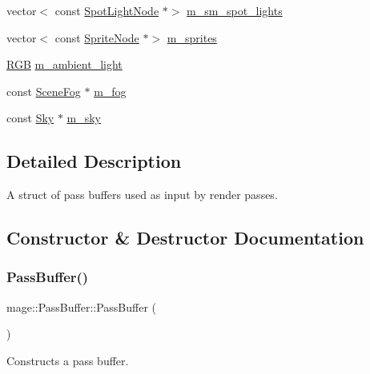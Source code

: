 \begin{DoxyCompactItemize}
\item 
vector$<$ const \hyperlink{namespacemage_aeed5dee4ff6c591eabb0e9114256df4a}{Spot\+Light\+Node} $\ast$$>$ \hyperlink{structmage_1_1_pass_buffer_aa28fb6d14ea463f82f35117e8dfa23fc}{m\+\_\+sm\+\_\+spot\+\_\+lights}
\item 
vector$<$ const \hyperlink{classmage_1_1_sprite_node}{Sprite\+Node} $\ast$$>$ \hyperlink{structmage_1_1_pass_buffer_ad742ad6712a63e9d58621da83a7fb900}{m\+\_\+sprites}
\item 
\hyperlink{structmage_1_1_r_g_b}{R\+GB} \hyperlink{structmage_1_1_pass_buffer_aafbd5cadbc04af03c6bce4eeb4a362f4}{m\+\_\+ambient\+\_\+light}
\item 
const \hyperlink{classmage_1_1_scene_fog}{Scene\+Fog} $\ast$ \hyperlink{structmage_1_1_pass_buffer_a3691cc52fe3bc5f1c86bf0dad36061d8}{m\+\_\+fog}
\item 
const \hyperlink{classmage_1_1_sky}{Sky} $\ast$ \hyperlink{structmage_1_1_pass_buffer_a19d0163dbfe7e60c664fdf433d47146b}{m\+\_\+sky}
\end{DoxyCompactItemize}


\subsection{Detailed Description}
A struct of pass buffers used as input by render passes. 

\subsection{Constructor \& Destructor Documentation}
\hypertarget{structmage_1_1_pass_buffer_a02e07a26327f6e57b193521636bb8e10}{}\label{structmage_1_1_pass_buffer_a02e07a26327f6e57b193521636bb8e10} 
\subsubsection{\texorpdfstring{Pass\+Buffer()}{PassBuffer()}\hspace{0.1cm}{\footnotesize\ttfamily [1/3]}}
{\footnotesize\ttfamily mage\+::\+Pass\+Buffer\+::\+Pass\+Buffer (\begin{DoxyParamCaption}{ }\end{DoxyParamCaption})}

Constructs a pass buffer. \hypertarget{structmage_1_1_pass_buffer_a1c6e779725227ebbb8e3d15a4515edbc}{}\label{structmage_1_1_pass_buffer_a1c6e779725227ebbb8e3d15a4515edbc} 
